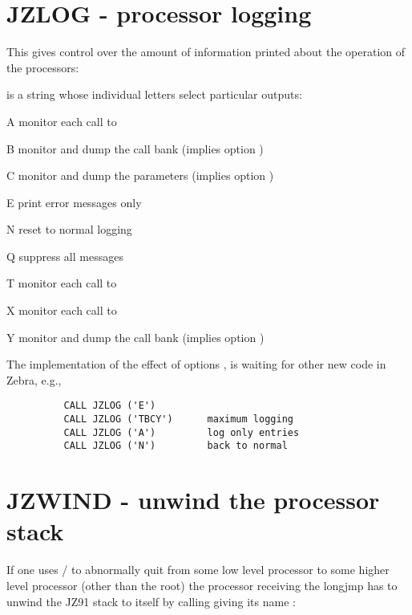 \section{JZLOG - processor logging}

This gives control over the amount of information printed
about the operation of the processors:


 is a  string whose individual letters select
particular outputs:

\begin{DLtt}{1}
\item[A]  monitor each call to 
\item[B]  monitor and dump the call bank (implies option )
\item[C]  monitor and dump the parameters (implies option )
\item[E]  print error messages only
\item[N]  reset to normal logging
\item[Q]  suppress all messages
\item[T]  monitor each call to 
\item[X]  monitor each call to 
\item[Y]  monitor and dump the call bank (implies option )
\end{DLtt} 

The implementation of the effect of options , is waiting
for other new code in Zebra, e.g.,

\begin{verbatim}
          CALL JZLOG ('E')
          CALL JZLOG ('TBCY')      maximum logging
          CALL JZLOG ('A')         log only entries
          CALL JZLOG ('N')         back to normal
\end{verbatim} 

\section{JZWIND - unwind the processor stack}

If one uses / 
to abnormally quit from some low level
processor to some higher level processor (other than the root)
the processor receiving the longjmp has to unwind the JZ91 stack
to itself by calling  giving its name :


